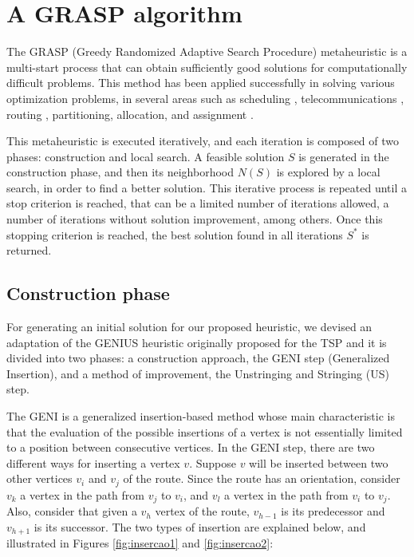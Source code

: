 \documentclass{ro}
\begin{document}

\section{A GRASP algorithm}
\label{sec:metod}


The GRASP (Greedy Randomized Adaptive Search Procedure)  metaheuristic is a multi-start process that can obtain sufficiently good solutions for computationally difficult problems. This method has been applied successfully in solving various optimization problems, in several areas such as scheduling \cite{park2013grasp}, telecommunications \cite{Sylvain}, routing \cite{hamidi2012hybrid},  partitioning, allocation, and assignment \cite{grasp03}.

This metaheuristic is executed iteratively, and each iteration is composed of two phases: construction and local search. A feasible solution $S$ is generated in the construction phase, and then its neighborhood $N(S)$ is explored by a local search, in order to find a better solution. This iterative process is repeated until a stop criterion is reached, that can be a limited number of iterations allowed, a number of iterations without solution improvement, among others. Once this stopping criterion is reached, the best solution found in all iterations $S^*$ is returned.



\subsection{Construction phase}
For generating an initial solution for our proposed heuristic, we devised an adaptation of the GENIUS heuristic \cite{genius} originally proposed for the TSP and it is divided into two phases: a construction approach, the GENI step (Generalized Insertion), and a method of improvement, the Unstringing and Stringing (US) step. 

The GENI is a generalized insertion-based method whose main characteristic is that the evaluation of the possible insertions of a vertex is not essentially limited to a position between consecutive vertices. In the GENI step, there are two different ways for inserting a vertex $ v $. Suppose $ v $ will be inserted between two other vertices $ v_i $ and $ v_j $ of the route. Since the route has an orientation, consider $ v_k $ a vertex in the path from $ v_j $ to $ v_i $, and $ v_l $ a vertex in the path from $ v_i $ to $ v_j $. Also, consider that given a $ v_h $ vertex of the route, $ v_ {h-1} $ is its predecessor and $ v_ {h + 1} $ is its successor. The two types of insertion are explained below, and illustrated in Figures \ref{fig:insercao1} and \ref{fig:insercao2}:
\end{document}
